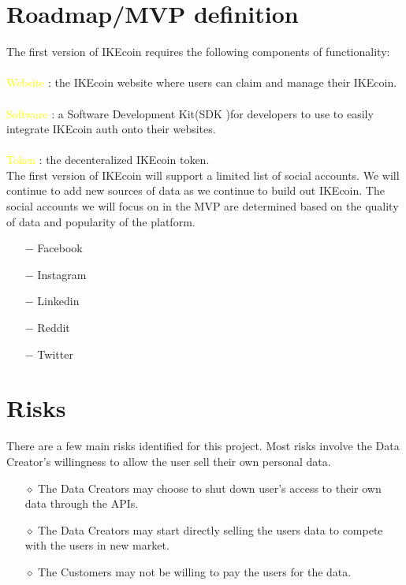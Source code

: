 \documentclass[12pt, letterpaper, twoside]{article}
\begin{document}
\section{Roadmap/MVP definition}
The first version of IKEcoin requires the following components of functionality:
\\
\\
\textcolor{yellow}{Website} : the IKEcoin website where users can claim and manage their IKEcoin.
\\
\\
\textcolor{yellow}{Software} : a Software Development Kit(SDK )for developers to use to easily integrate IKEcoin auth onto their websites.
\\
\\
\textcolor{yellow}{Token} : the decenteralized IKEcoin token. \\


The first version of IKEcoin will support a limited list of social accounts. We will continue to add new sources of data as we continue to build out IKEcoin. The social accounts we will focus on in the MVP are determined based on the quality of data and popularity of the platform. 
\begin{itemize}
  \setlength{\itemsep}{1pt}
  \setlength{\parskip}{0pt}
  \setlength{\parsep}{0pt}
  \item[$-$] Facebook
  \item[$-$] Instagram
  \item[$-$] Linkedin
  \item[$-$] Reddit
  \item[$-$] Twitter
\end{itemize}

\section{Risks}
There are a few main risks identified for this project. Most risks involve the Data Creator's willingness to allow the user sell their own personal data.
\begin{itemize}
  \setlength{\itemsep}{1pt}
  \setlength{\parskip}{0pt}
  \setlength{\parsep}{0pt}
  \item[$\diamond$]  The Data Creators may  choose to shut down user’s access to their own data through the APIs.
  \item[$\diamond$]  The Data Creators may start directly selling the users data to compete with the users in new market.
  \item[$\diamond$]  The Customers may not be willing to pay the users for the data.
\end{itemize}
\end{document}
